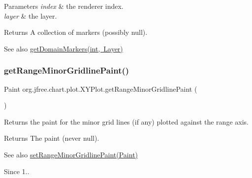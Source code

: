 \begin{DoxyParams}{Parameters}
{\em index} & the renderer index. \\
\hline
{\em layer} & the layer.\\
\hline
\end{DoxyParams}
\begin{DoxyReturn}{Returns}
A collection of markers (possibly {\ttfamily null}).
\end{DoxyReturn}
\begin{DoxySeeAlso}{See also}
\mbox{\hyperlink{classorg_1_1jfree_1_1chart_1_1plot_1_1_x_y_plot_a712c78e9b5fc6a88b833b8f39ee58ad7}{get\+Domain\+Markers(int, Layer)}} 
\end{DoxySeeAlso}
\mbox{\label{classorg_1_1jfree_1_1chart_1_1plot_1_1_x_y_plot_a159858bb023850b61558031e98e7c2d4}} 
\subsubsection{\texorpdfstring{get\+Range\+Minor\+Gridline\+Paint()}{getRangeMinorGridlinePaint()}}
{\footnotesize\ttfamily Paint org.\+jfree.\+chart.\+plot.\+X\+Y\+Plot.\+get\+Range\+Minor\+Gridline\+Paint (\begin{DoxyParamCaption}{ }\end{DoxyParamCaption})}

Returns the paint for the minor grid lines (if any) plotted against the range axis.

\begin{DoxyReturn}{Returns}
The paint (never {\ttfamily null}).
\end{DoxyReturn}
\begin{DoxySeeAlso}{See also}
\mbox{\hyperlink{classorg_1_1jfree_1_1chart_1_1plot_1_1_x_y_plot_acc1ac8ab3f7e5f4fb3d69723c1bc8b09}{set\+Range\+Minor\+Gridline\+Paint(\+Paint)}}
\end{DoxySeeAlso}
\begin{DoxySince}{Since}
1.. 
\end{DoxySince}
\mbox{\label{classorg_1_1jfree_1_1chart_1_1plot_1_1_x_y_plot_afcd3a70c9771ea152f93518287e18319}} 
